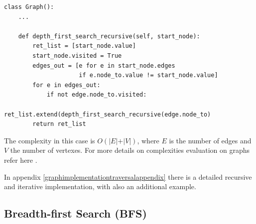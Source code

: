 \begin{lstlisting}[firstnumber=1, caption={Recursive implementation of a depth-first search.}]
class Graph():
	...
	
	def depth_first_search_recursive(self, start_node):
		ret_list = [start_node.value]
		start_node.visited = True
		edges_out = [e for e in start_node.edges
					 if e.node_to.value != start_node.value]
		for e in edges_out:
			if not edge.node_to.visited:
				ret_list.extend(depth_first_search_recursive(edge.node_to)
		return ret_list
\end{lstlisting}

The complexity in this case is \(O(\vert E \vert + \vert V \vert)\), where \(E\) is the number of edges and \(V\) the number of vertexes. For more details on complexities evaluation on graphs refer here \cite{goodrich2013data}.

In appendix \ref{graphimplementationtraversalappendix} there is a detailed recursive and iterative implementation, with also an additional example.
\subsection{Breadth-first Search (BFS)}